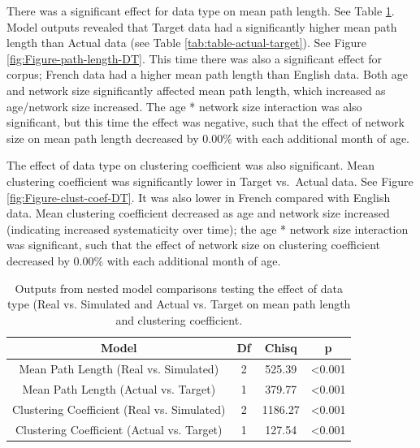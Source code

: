 \documentclass[
  man]{apa6}
\begin{document}
There was a significant effect for data type on mean path length. See Table \ref{tab:table-model-output}. Model outputs revealed that Target data had a significantly higher mean path length than Actual data (see Table \ref{tab:table-actual-target}). See Figure \ref{fig:Figure-path-length-DT}. This time there was also a significant effect for corpus; French data had a higher mean path length than English data. Both age and network size significantly affected mean path length, which increased as age/network size increased. The age * network size interaction was also significant, but this time the effect was negative, such that the effect of network size on mean path length decreased by 0.00\% with each additional month of age.

The effect of data type on clustering coefficient was also significant. Mean clustering coefficient was significantly lower in Target vs.~Actual data. See Figure \ref{fig:Figure-clust-coef-DT}. It was also lower in French compared with English data. Mean clustering coefficient decreased as age and network size increased (indicating increased systematicity over time); the age * network size interaction was significant, such that the effect of network size on clustering coefficient decreased by 0.00\% with each additional month of age.

\begin{longtable}[t]{cccc}
\caption{\label{tab:table-model-output}Outputs from nested model comparisons testing the effect of data type (Real vs. Simulated and Actual vs. Target on mean path length and clustering coefficient.}\\
\toprule
Model & Df & Chisq & p\\
\midrule
Mean Path Length (Real vs. Simulated) & 2 & 525.39 & <0.001\\
Mean Path Length (Actual vs. Target) & 1 & 379.77 & <0.001\\
Clustering Coefficient (Real vs. Simulated) & 2 & 1186.27 & <0.001\\
Clustering Coefficient (Actual vs. Target) & 1 & 127.54 & <0.001\\
\midrule
\bottomrule
\end{longtable}
\end{document}
